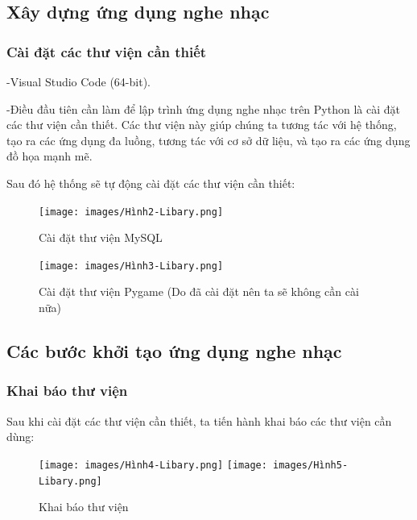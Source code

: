 \documentclass[a4paper]{article}
\begin{document}
\subsection{Xây dựng ứng dụng nghe nhạc}
\subsubsection{Cài đặt các thư viện cần thiết}
\begin{flushleft}
	-Visual Studio Code (64-bit).

	-Điều đầu tiên cần làm để lập trình ứng dụng nghe nhạc trên Python là cài đặt các thư viện cần thiết.
	Các thư viện này giúp chúng ta tương tác với hệ thống, tạo ra các ứng dụng đa luồng,
	tương tác với cơ sở dữ liệu, và tạo ra các ứng dụng đồ họa mạnh mẽ.

	Sau đó hệ thống sẽ tự động cài đặt các thư viện cần thiết:
	\begin{figure}[h]
		\centering
		\texttt{[image: images/Hình2-Libary.png]}
		\caption{Cài đặt thư viện MySQL}
	\end{figure}
	\begin{figure}[h]
		\centering
		\texttt{[image: images/Hình3-Libary.png]}
		\caption{Cài đặt thư viện Pygame (Do đã cài đặt nên ta sẽ không cần cài nữa)}
	\end{figure}
\end{flushleft}
\subsection{Các bước khởi tạo ứng dụng nghe nhạc}
\subsubsection{Khai báo thư viện}
\begin{flushleft}
	Sau khi cài đặt các thư viện cần thiết, ta tiến hành khai báo các thư viện cần dùng:
	\begin{figure}[h]
		\centering
		\texttt{[image: images/Hình4-Libary.png]}
		\texttt{[image: images/Hình5-Libary.png]}
		\caption{Khai báo thư viện}
	\end{figure}
\end{flushleft}
\newpage
\end{document}

